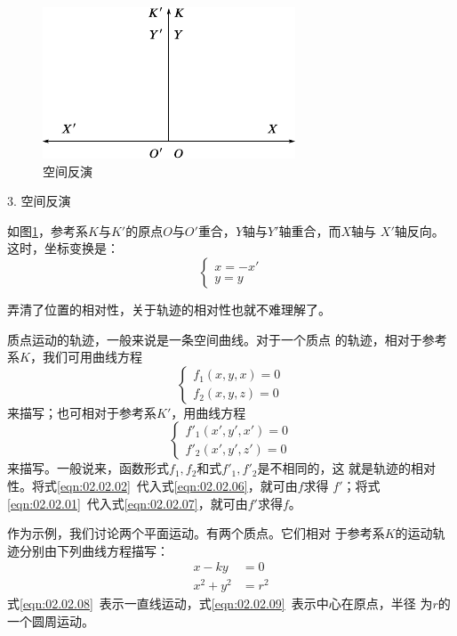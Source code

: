 \begin{figure}
  \centering
  \includegraphics{figure/fig02.04}
  \caption{空间反演}
  \label{fig:02.04}
\end{figure}
\textsf{3. 空间反演}

如图\ref{fig:02.04}，参考系$K$与$K'$的原点$O$与$O'$重合，$Y$轴与$Y'$轴重合，而$X$轴与
$X'$轴反向。这时，坐标变换是：
{\setlength{\mathindent}{2em}
  \begin{equation}\label{eqn:02.02.05}
    \left\{\begin{array}{l}
      x=-x' \\
      y=y
    \end{array}\right.
  \end{equation}}%

弄清了位置的相对性，关于轨迹的相对性也就不难理解了。

质点运动的轨迹，一般来说是一条空间曲线。对于一个质点
的轨迹，相对于参考系$ K $，我们可用曲线方程
\begin{equation}\label{eqn:02.02.06}
  \left\{\begin{array}{l}
    f_1\left(x,y,x\right)=0 \\
    f_2\left(x,y,z\right)=0
  \end{array}\right.
\end{equation}
来描写；也可相对于参考系$K'$，用曲线方程
\clearpage
\begin{equation}\label{eqn:02.02.07}
  \left\{\begin{array}{l}
    f'_1\left(x',y',x'\right)=0 \\
    f'_2\left(x',y',z'\right)=0
  \end{array}\right.
\end{equation}
来描写。一般说来，函数形式$f_1,f_2$和式$f'_1,f'_2$是不相同的，这
就是轨迹的相对性。将式\eqref{eqn:02.02.02}~代入式\eqref{eqn:02.02.06}，就可由$f$求得
$f'$；将式\eqref{eqn:02.02.01}~代入式\eqref{eqn:02.02.07}，就可由$f'$求得$f$。

作为示例，我们讨论两个平面运动。有两个质点。它们相对
于参考系$K$的运动轨迹分别由下列曲线方程描写：
\begin{align}
  x-ky    & =0  \label{eqn:02.02.08}  \\
  x^2+y^2 & =r^2 \label{eqn:02.02.09}
\end{align}
式\eqref{eqn:02.02.08}~表示一直线运动，式\eqref{eqn:02.02.09}~表示中心在原点，半径
为$r$的一个圆周运动。

